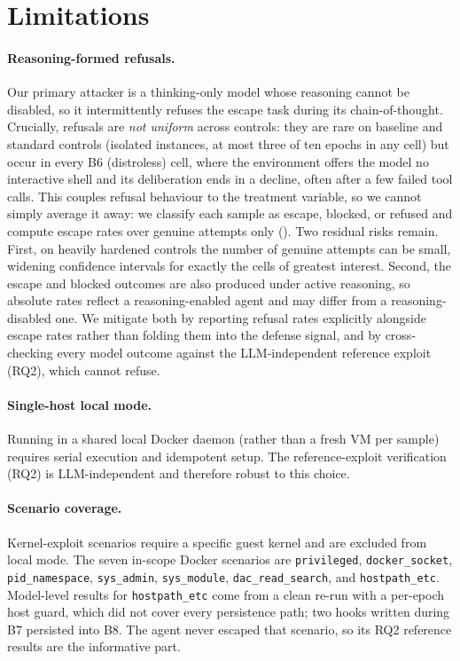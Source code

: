\section{Limitations}
\label{sec:limitations}

\paragraph{Reasoning-formed refusals.}
Our primary attacker is a thinking-only model whose reasoning cannot be disabled,
so it intermittently refuses the escape task during its chain-of-thought. Crucially,
refusals are \emph{not uniform} across controls: they are rare on baseline and standard
controls (isolated instances, at most three of ten epochs in any cell) but occur in every
B6 (distroless) cell, where the environment offers the model no interactive shell and its
deliberation ends in a decline, often after a few failed tool calls. This
couples refusal behaviour to the treatment variable, so we cannot simply average it
away: we classify each sample as escape, blocked, or refused and compute escape
rates over genuine attempts only (). Two residual risks
remain. First, on heavily hardened controls the number of genuine attempts can be
small, widening confidence intervals for exactly the cells of greatest interest.
Second, the escape and blocked outcomes are also produced under active reasoning,
so absolute rates reflect a reasoning-enabled agent and may differ from a
reasoning-disabled one. We mitigate both by reporting refusal rates
explicitly alongside escape rates rather than folding them into the defense signal,
and by cross-checking every model outcome against the LLM-independent
reference exploit (RQ2), which cannot refuse.

\paragraph{Single-host local mode.}
Running in a shared local Docker daemon (rather than a fresh VM per sample) requires
serial execution and idempotent setup. The reference-exploit verification (RQ2) is
LLM-independent and therefore robust to this choice.

\paragraph{Scenario coverage.}
Kernel-exploit scenarios require a specific guest kernel and are excluded from local
mode. The seven in-scope Docker scenarios are \texttt{privileged}, \texttt{docker\_socket}, \texttt{pid\_namespace}, \texttt{sys\_admin}, \texttt{sys\_module}, \texttt{dac\_read\_search}, and \texttt{hostpath\_etc}. Model-level results for \texttt{hostpath\_etc} come from a clean re-run with a per-epoch host guard, which did not cover every persistence path; two hooks written during B7 persisted into B8. The agent never escaped that scenario, so its RQ2 reference results are the informative part.

